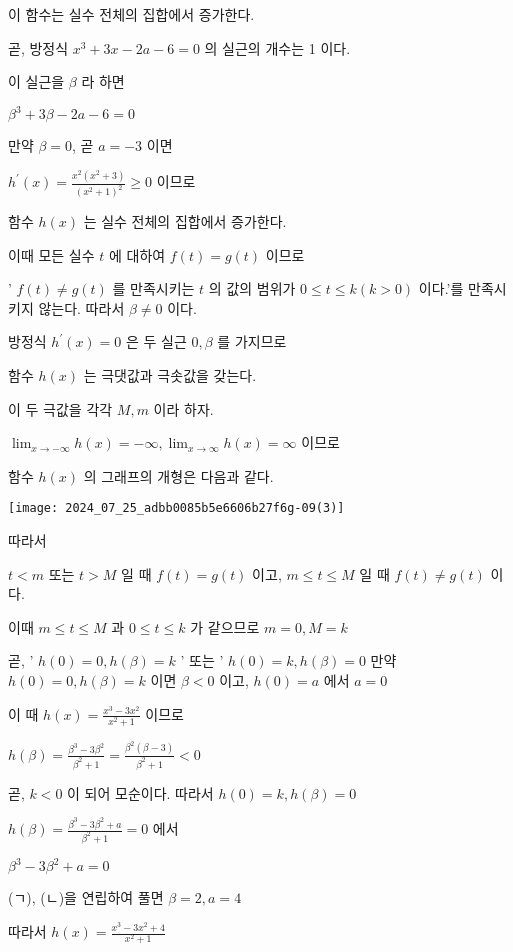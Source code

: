 \documentclass[10pt]{article}
\begin{document}
이 함수는 실수 전체의 집합에서 증가한다.

곧, 방정식 $x^{3}+3 x-2 a-6=0$ 의 실근의 개수는 1 이다.

이 실근을 $\beta$ 라 하면

$\beta^{3}+3 \beta-2 a-6=0$

만약 $\beta=0$, 곧 $a=-3$ 이면

$h^{\prime}(x)=\frac{x^{2}\left(x^{2}+3\right)}{\left(x^{2}+1\right)^{2}} \geq 0$ 이므로

함수 $h(x)$ 는 실수 전체의 집합에서 증가한다.

이때 모든 실수 $t$ 에 대하여 $f(t)=g(t)$ 이므로

' $f(t) \neq g(t)$ 를 만족시키는 $t$ 의 값의 범위가 $0 \leq t \leq k(k>0)$ 이다.'를 만족시키지 않는다. 따라서 $\beta \neq 0$ 이다.

방정식 $h^{\prime}(x)=0$ 은 두 실근 $0, \beta$ 를 가지므로

함수 $h(x)$ 는 극댓값과 극솟값을 갖는다.

이 두 극값을 각각 $M, m$ 이라 하자.

$\lim _{x \rightarrow-\infty} h(x)=-\infty, \lim _{x \rightarrow \infty} h(x)=\infty$ 이므로

함수 $h(x)$ 의 그래프의 개형은 다음과 같다.

\begin{center}
\texttt{[image: 2024\_07\_25\_adbb0085b5e6606b27f6g-09(3)]}
\end{center}

따라서

$t<m$ 또는 $t>M$ 일 때 $f(t)=g(t)$ 이고, $m \leq t \leq M$ 일 때 $f(t) \neq g(t)$ 이다.

이때 $m \leq t \leq M$ 과 $0 \leq t \leq k$ 가 같으므로 $m=0, M=k$

곧, ' $h(0)=0, h(\beta)=k$ ' 또는 ' $h(0)=k, h(\beta)=0$ 만약 $h(0)=0, h(\beta)=k$ 이면 $\beta<0$ 이고, $h(0)=a$ 에서 $a=0$

이 때 $h(x)=\frac{x^{3}-3 x^{2}}{x^{2}+1}$ 이므로

$h(\beta)=\frac{\beta^{3}-3 \beta^{2}}{\beta^{2}+1}=\frac{\beta^{2}(\beta-3)}{\beta^{2}+1}<0$

곧, $k<0$ 이 되어 모순이다. 따라서 $h(0)=k, h(\beta)=0$

$h(\beta)=\frac{\beta^{3}-3 \beta^{2}+a}{\beta^{2}+1}=0$ 에서

$\beta^{3}-3 \beta^{2}+a=0$

(ㄱ), (ㄴ)을 연립하여 풀면 $\beta=2, a=4$

따라서 $h(x)=\frac{x^{3}-3 x^{2}+4}{x^{2}+1}$
\end{document}
